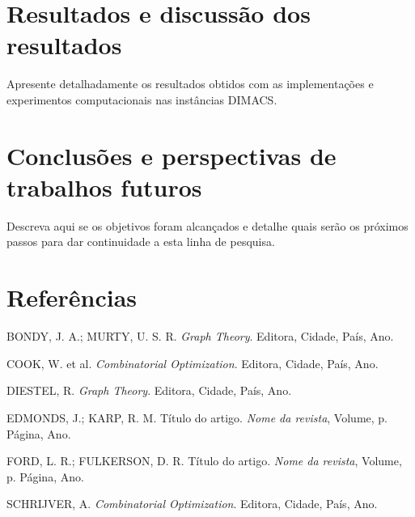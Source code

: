 \documentclass[12pt,a4paper]{article}
\begin{document}
\section{Resultados e discussão dos resultados}
Apresente detalhadamente os resultados obtidos com as implementações e experimentos computacionais nas instâncias DIMACS.

\section{Conclusões e perspectivas de trabalhos futuros}
Descreva aqui se os objetivos foram alcançados e detalhe quais serão os próximos passos para dar continuidade a esta linha de pesquisa.

\section{Referências}

BONDY, J. A.; MURTY, U. S. R. \textit{Graph Theory}. Editora, Cidade, País, Ano.

COOK, W. et al. \textit{Combinatorial Optimization}. Editora, Cidade, País, Ano.

DIESTEL, R. \textit{Graph Theory}. Editora, Cidade, País, Ano.

EDMONDS, J.; KARP, R. M. Título do artigo. \textit{Nome da revista}, Volume, p. Página, Ano.

FORD, L. R.; FULKERSON, D. R. Título do artigo. \textit{Nome da revista}, Volume, p. Página, Ano.

SCHRIJVER, A. \textit{Combinatorial Optimization}. Editora, Cidade, País, Ano.
\end{document}
